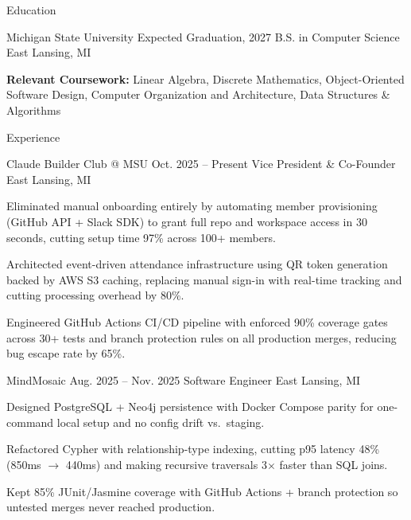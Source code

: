\documentclass[
	11pt
]{../../resume}
\begin{document}
	\begin{rSection}{E}{ducation}
		\begin{rSectionEntry}
			{Michigan State University}
			{Expected Graduation, 2027}
			{B.S. in Computer Science}
			{}
			{East Lansing, MI}

			\item \textbf{Relevant Coursework:} Linear Algebra, Discrete Mathematics, Object-Oriented Software Design, Computer Organization and Architecture, Data Structures \& Algorithms
		\end{rSectionEntry}
	\end{rSection}

	\begin{rSection}{E}{xperience}
		\begin{rSectionEntry}
			{Claude Builder Club @ MSU}
			{Oct. 2025 -- Present}
			{Vice President \& Co-Founder}
			{}
			{East Lansing, MI}

			\item Eliminated manual onboarding entirely by automating member provisioning (GitHub API + Slack SDK) to grant full repo and workspace access in 30 seconds, cutting setup time 97\% across 100+ members.
			\item Architected event-driven attendance infrastructure using QR token generation backed by AWS S3 caching, replacing manual sign-in with real-time tracking and cutting processing overhead by 80\%.
			\item Engineered GitHub Actions CI/CD pipeline with enforced 90\% coverage gates across 30+ tests and branch protection rules on all production merges, reducing bug escape rate by 65\%.
		\end{rSectionEntry}

		\begin{rSectionEntry}
			{MindMosaic}
			{Aug. 2025 -- Nov. 2025}
			{Software Engineer}
			{}
			{East Lansing, MI}

			\item Designed PostgreSQL + Neo4j persistence with Docker Compose parity for one-command local setup and no config drift vs.\ staging.
			\item Refactored Cypher with relationship-type indexing, cutting p95 latency 48\% (850ms $\rightarrow$ 440ms) and making recursive traversals 3$\times$ faster than SQL joins.
			\item Kept 85\% JUnit/Jasmine coverage with GitHub Actions + branch protection so untested merges never reached production.
		\end{rSectionEntry}
	\end{rSection}
\end{document}
